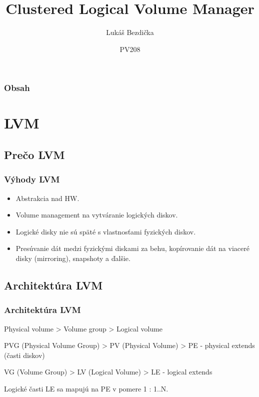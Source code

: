 \documentclass{beamer}
\title[CLVM]
{Clustered Logical Volume Manager}
\author[Bezdička L.]
{Lukáš Bezdička}
\institute[FI MUNI]
{ Fakulta informatiky\\
  Masarykova univerzita}
\date[2011] 
{PV208}
\begin{document}
\begin{frame}
  \titlepage
\end{frame}

\begin{frame}
  \frametitle{Obsah}
  \tableofcontents
\end{frame}

\section{LVM}

\subsection{Prečo LVM}

\begin{frame}
  \frametitle{Výhody LVM}

  \begin{itemize}
  \item Abstrakcia nad HW.
  \item Volume management na vytváranie logických diskov.
  \item Logické disky nie sú späté s vlastnosťami fyzických diskov.
  \item Presúvanie dát medzi fyzickými diskami za behu, kopírovanie dát na viaceré disky (mirroring), snapshoty a ďalšie.
  \end{itemize}
\end{frame}

\subsection{Architektúra LVM}

\begin{frame}
  \frametitle{Architektúra LVM}
  Physical volume > Volume group > Logical volume
\end{frame}

\begin{frame}
PVG (Physical Volume Group) > PV (Physical Volume) > PE - physical extends (časti diskov)
\end{frame}

\begin{frame}
VG (Volume Group) > LV (Logical Volume) > LE - logical extends
\end{frame}

\begin{frame}
Logické časti LE sa mapujú na PE v pomere 1 : 1..N.
\end{frame}
\end{document}

